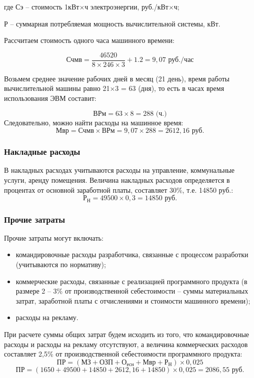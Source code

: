 \documentclass[a4paper]{extarticle}
\numberwithin{equation}{section}
\begin{document}
где Сэ – стоимость 1кВт$\times$ч электроэнергии, руб./кВт$\times$ч;\par
Р – суммарная потребляемая мощность вычислительной системы, кВт.\par
Рассчитаем стоимость одного часа машинного времени:\par
\begin{equation}
\label{form9}
	\text{Счмв}=\frac{46520}{8\times 246\times 3}+1.2 = 9,07\text{ руб./час}
\end{equation}\par
Возьмем среднее значение рабочих дней в месяц (21 день), время работы вычислительной машины равно 21$\times$3 = 63 (дня), то есть в часах время использования ЭВМ составит:\par
\begin{equation}
\label{form10}
	\text{ВРм}=63\times 8=288\text{ (ч.)}
\end{equation}
Следовательно, можно найти расходы на машинное время:
\begin{equation}
\label{form11}
	\text{Мвр}=\text{Счмв}\times\text{ВРм}=9,07\times 288 = 2612,16\text{ руб.}
\end{equation}
\subsubsection{Накладные расходы}
В накладных расходах учитываются расходы на управление, коммунальные услуги, аренду помещения. Величина накладных расходов определяется в процентах от основной заработной платы, составляет 30\%, т.е. 14850 руб.:
\begin{equation}
\label{form12}
	\text{Р}_\text{Н}=49500\times 0,3=14850\text{ руб.}
\end{equation}

\subsubsection{Прочие затраты}
Прочие затраты могут включать:
\begin{itemize}
\item командировочные расходы разработчика, связанные с процессом разработки (учитываются по нормативу);
\item коммерческие расходы, связанные с реализацией программного продукта (в размере 2 – 3\% от производственной себестоимости – суммы материальных затрат, заработной платы с отчислениями и стоимости машинного времени);
\item расходы на рекламу.
\end{itemize}\par
При расчете суммы общих затрат будем исходить из того, что командировочные расходы и расходы на рекламу отсутствуют, а величина коммерческих расходов составляет 2,5\% от производственной себестоимости программного продукта:
\begin{equation}
\label{form13}
	\text{ПР}=(\text{МЗ}+\text{ОЗП}+\text{О}_\text{есн}+\text{Мвр}+\text{Р}_\text{Н})\times 0,025
\end{equation}
$$\text{ПР}=(1650+49500+14850+2612,16+14850)\times 0,025=2086,55\text{ руб.}$$
\end{document}
